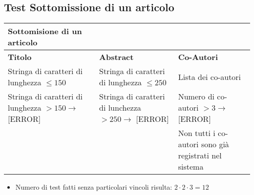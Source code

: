 \subsection{Test Sottomissione di un articolo}
\label{sec:test_sottomissione}
\begin{tabular}{|p{4cm}|p{4cm}|p{4cm}|}
  \hline
  \rowcolor{SkyBlue}
  \textbf{Sottomisione di un articolo} & & \\
  \hline
    \rowcolor{Red}
  \textbf{Titolo} & \textbf{Abstract} & \textbf{Co-Autori} \\
  \hline
  Stringa di caratteri di lunghezza \(\leq 150\)  & Stringa di caratteri di lunghezza \(\leq 250\) & Lista dei co-autori \\
  \hline
  Stringa di caratteri di lunghezza \(> 150 \rightarrow\) [ERROR] & Stringa di caratteri di lunchezza \(> 250 \rightarrow\) [ERROR]& Numero di co-autori \(> 3 \rightarrow\) [ERROR]\\
  \hline
   & & Non tutti i co-autori sono già registrati nel sistema\\
  \hline
\end{tabular}
\begin{itemize}
\item Numero di test fatti senza particolari vincoli risulta: \(2\cdot2\cdot3 = 12\)
\end{itemize}

